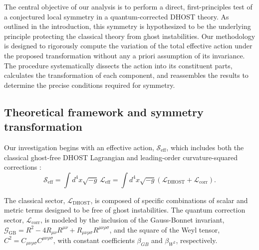\documentclass[twocolumn]{aastex631}
\begin{document}
The central objective of our analysis is to perform a direct, first-principles test of a conjectured local symmetry in a quantum-corrected DHOST theory. As outlined in the introduction, this symmetry is hypothesized to be the underlying principle protecting the classical theory from ghost instabilities. Our methodology is designed to rigorously compute the variation of the total effective action under the proposed transformation without any a priori assumption of its invariance. The procedure systematically dissects the action into its constituent parts, calculates the transformation of each component, and reassembles the results to determine the precise conditions required for symmetry.
\subsection{Theoretical framework and symmetry transformation}
Our investigation begins with an effective action, $\mathcal{S}_{\text{eff}}$, which includes both the classical ghost-free DHOST Lagrangian \citep{nezhad2025degeneratehigherorderscalartensortheories} and leading-order curvature-squared corrections \citep{lambiase2025exorcisingghostsgravitationalwaves}:
\begin{equation}
\mathcal{S}_{\text{eff}} = \int d^4x \sqrt{-g} \, \mathcal{L}_{\text{eff}} = \int d^4x \sqrt{-g} \left( \mathcal{L}_{\text{DHOST}} + \mathcal{L}_{\text{corr}} \right).
\end{equation}
\citep{kobayashi2024weakfieldregimescalartensortheories,takadera2025sphericalcollapsedhosttheories}

The classical sector, $\mathcal{L}_{\text{DHOST}}$, is composed of specific combinations of scalar and metric terms designed to be free of ghost instabilities. The quantum correction sector, $\mathcal{L}_{\text{corr}}$, is modeled by the inclusion of the Gauss-Bonnet invariant, $\mathcal{G}_{\text{GB}} = R^2 - 4R_{\mu\nu}R^{\mu\nu} + R_{\mu\nu\rho\sigma}R^{\mu\nu\rho\sigma}$, and the square of the Weyl tensor, $C^2 = C_{\mu\nu\rho\sigma}C^{\mu\nu\rho\sigma}$, with constant coefficients $\beta_{GB}$ and $\beta_{W^2}$, respectively. \citep{cheung2017positivitycurvaturesquaredcorrectionsgravity,sucu2025quantumcorrectedthermodynamicsconformalweyl}
\end{document}
